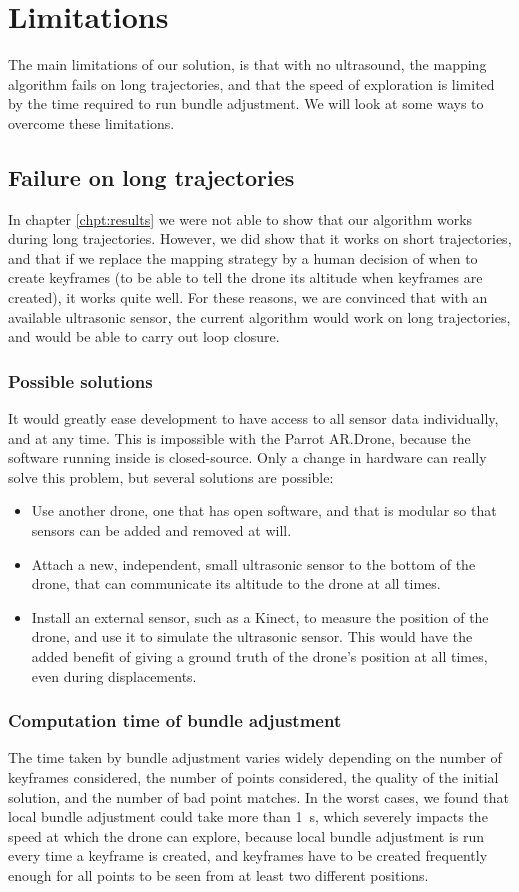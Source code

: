 \section{Limitations}
The main limitations of our solution, is that with no ultrasound, the mapping algorithm fails on long trajectories, and that the speed of exploration is limited by the time required to run bundle adjustment. We will look at some ways to overcome these limitations.

\subsection{Failure on long trajectories}
In chapter \ref{chpt:results} we were not able to show that our algorithm works during long trajectories. However, we did show that it works on short trajectories, and that if we replace the mapping strategy by a human decision of when to create keyframes (to be able to tell the drone its altitude when keyframes are created), it works quite well. For these reasons, we are convinced that with an available ultrasonic sensor,  the current algorithm would work on long trajectories, and would be able to carry out loop closure.

\subsubsection{Possible solutions}
It would greatly ease development to have access to all sensor data individually, and at any time. This is impossible with the Parrot AR.Drone, because the software running inside is closed-source. Only a change in hardware can really solve this problem, but several solutions are possible:
\begin{itemize}
\item Use another drone, one that has open software, and that is modular so that sensors can be added and removed at will.
\item Attach a new, independent, small ultrasonic sensor to the bottom of the drone, that can communicate its altitude to the drone at all times.
\item Install an external sensor, such as a Kinect\texttrademark , to measure the position of the drone, and use it to simulate the ultrasonic sensor. This would have the added benefit of giving a ground truth of the drone's position at all times, even during displacements.
\end{itemize}

\subsubsection{Computation time of bundle adjustment}
The time taken by bundle adjustment varies widely depending on the number of keyframes considered, the number of points considered, the quality of the initial solution, and the number of bad point matches. In the worst cases, we found that local bundle adjustment could take more than \SI{1}{\second}, which severely impacts the speed at which the drone can explore, because local bundle adjustment is run every time a keyframe is created, and keyframes have to be created frequently enough for all points to be seen from at least two different positions.

